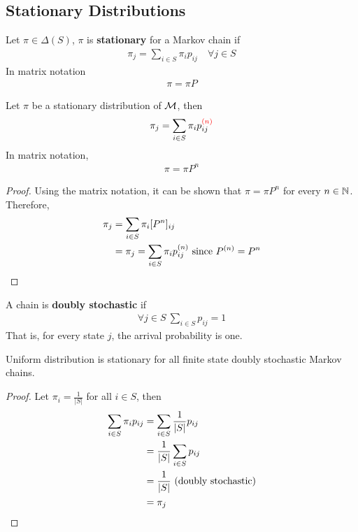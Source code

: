 \documentclass{article}
\newcommand{\upn}[0]{^{(n)}}
\begin{document}
    \subsection{Stationary Distributions}
    \begin{definition}
    	Let $\pi \in \Delta(S)$, $\pi$ is \textbf{stationary} for a Markov chain if
    	\begin{align}
    		\pi_j = \sum_{i \in S} \pi_i p_{ij}\quad \forall j \in S
    	\end{align}
    	In matrix notation
    	\begin{align}
    		\pi = \pi P
    	\end{align}
    \end{definition}
    
    \begin{proposition}
    	Let $\pi$ be a stationary distribution of $\mathcal{{M}}$, then 
    	\begin{align}
    		\pi_j = \sum_{i \in S} \pi_i p_{ij}^{\textcolor{red}{(n)}}
    	\end{align}
    	In matrix notation,
    	\begin{align}
    		\pi = \pi P^n
    	\end{align}
    \end{proposition}
    
    \begin{proof}
    	Using the matrix notation, it can be shown that $\pi = \pi P^n$ for every $n \in \mathbb{N}$. Therefore,
    	\begin{align}
    		\pi_j &= \sum_{i \in S} \pi_i [P^n]_{ij} \\
    		&= \pi_j = \sum_{i \in S} \pi_i p_{ij}\upn \tx{ since } P\upn = P^n
    	\end{align}
    \end{proof}
    
    \begin{definition}
    	A chain is \textbf{doubly stochastic} if
    	\begin{align}
    		\forall j \in S\ \sum_{i \in S} p_{ij} = 1
    	\end{align}
    	That is, for every state $j$, the arrival probability is one.
    \end{definition}

	\begin{proposition}
		Uniform distribution is stationary for all finite state doubly stochastic Markov chains.
	\end{proposition}

	\begin{proof}
		Let $\pi_i = \frac{1}{|S|}$ for all $i \in S$, then
		\begin{align}
			\sum_{i \in S} \pi_i p_{ij} &= \sum_{i \in S} \frac{1}{|S|} p_{ij} \\
			&= \frac{1}{|S|} \sum_{i \in S} p_{ij} \\
			&= \frac{1}{|S|} \text{{ (doubly stochastic)}} \\
			&= \pi_j
		\end{align}
	\end{proof}
    
\end{document}
